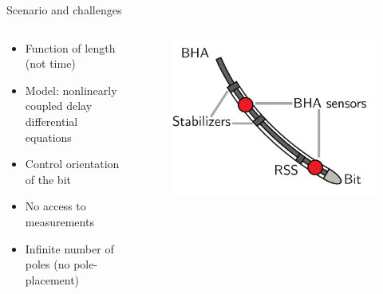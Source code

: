 \documentclass[10pt]{beamer}
\begin{document}
\begin{frame}{Scenario and challenges}
\begin{columns}
\begin{column}{0.5\textwidth}
	\begin{itemize}\setlength\itemsep{2.5em}
	\item Function of length (not time)
	\item Model: nonlinearly coupled delay differential equations
	\item Control orientation of the bit
	\item No access to measurements
	\item Infinite number of poles (no pole-placement)
	\end{itemize}
\end{column}
	\begin{column}{0.4\textwidth}
	\begin{figure}[ht]\centering
		\includegraphics[width=1.2\textwidth]{images/Sensors.pdf}
	\end{figure}
	\end{column}
\end{columns}
\end{frame}
\end{document}
